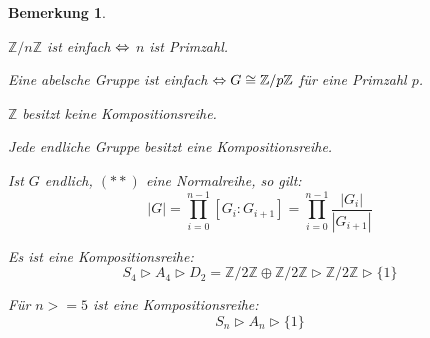 \documentclass[a4paper,10pt,german]{scrbook}
\theoremstyle{saetze}
\theoremstyle{definitionen}
\newtheorem{Bem}[Def]{Bemerkung}
\begin{document}
\begin{Bem}
\mbox{}
\begin{enum}
\item $\mathbb{Z}/n\mathbb{Z}$ ist einfach $\Leftrightarrow$ $n$ ist Primzahl.
\item Eine abelsche Gruppe ist einfach $\Leftrightarrow G \cong
\mathbb{Z}/p\mathbb{Z}$ für eine Primzahl $p$.
\item $\mathbb{Z}$ besitzt keine Kompositionsreihe.
\item Jede endliche Gruppe besitzt eine Kompositionsreihe.
\item Ist $G$ endlich, $(\ast \ast)$ eine Normalreihe, so gilt:
\[ |G| = \prod_{i=0}^{n-1} [ G_i:G_{i+1} ]
= \prod_{i=0}^{n-1} \frac{|G_i|}{|G_{i+1}|}\]
\item 
Es ist eine Kompositionsreihe:
\[ S_4 \triangleright A_4 \triangleright D_2 = \mathbb Z/2\mathbb Z \oplus \mathbb Z/2 \mathbb Z \triangleright \mathbb Z/2\mathbb Z \triangleright \{1\}\]
\item 
Für $n>=5$ ist eine Kompositionsreihe:
\[ S_n \triangleright A_n \triangleright \{1\}\]
\end{enum}
\end{Bem}
\end{document}
